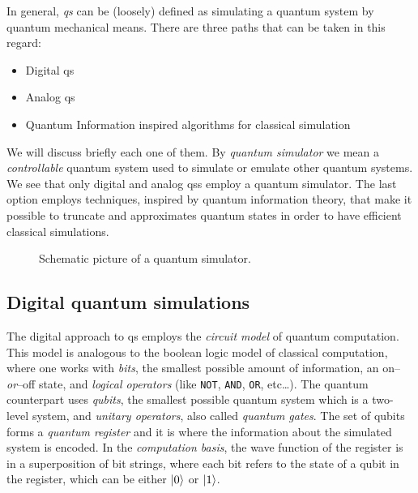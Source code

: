 In general, \emph{\acf{qs}} can be (loosely) defined as simulating a quantum system by quantum mechanical means.
There are three paths that can be taken in this regard:
\begin{itemize}
    \item Digital \acl{qs}
    \item Analog \acl{qs}
    \item Quantum Information inspired algorithms for classical simulation
\end{itemize}
We will discuss briefly each one of them.
By \emph{quantum simulator} we mean a \emph{controllable} quantum system used to simulate or emulate other quantum systems.
We see that only digital and analog \ac{qs}s employ a quantum simulator.
The last option employs techniques, inspired by quantum information theory, that make it possible to truncate and approximates quantum states in order to have efficient classical simulations.


\begin{figure}[t]
    \centering
    
    \caption{Schematic picture of a quantum simulator.}
\end{figure}



\subsection{Digital quantum simulations}
\label{sub:digital_quantum_simulations}

The digital approach to \ac{qs} employs the \emph{circuit model} of quantum computation.
This model is analogous to the boolean logic model of classical computation, where one works with \emph{bits}, the smallest possible amount of information, an on--\emph{or}--off state, and \emph{logical operators} (like \texttt{NOT}, \texttt{AND}, \texttt{OR}, etc\dots).
The quantum counterpart uses \emph{qubits}, the smallest possible quantum system which is a two-level system, and \emph{unitary operators}, also called \emph{quantum gates}.
The set of qubits forms a \emph{quantum register} and it is where the information about the simulated system is encoded.
In the \emph{computation basis}, the wave function of the register is in a superposition of bit strings, where each bit refers to the state of a qubit in the register, which can be either $\ket{0}$ or $\ket{1}$.


